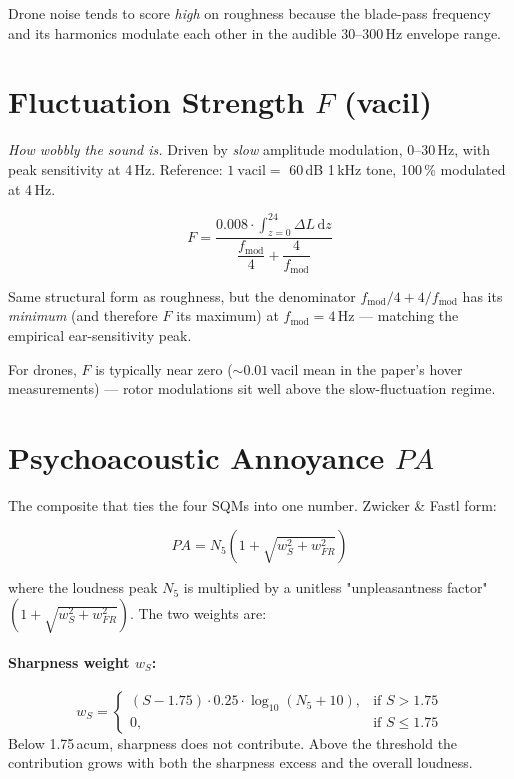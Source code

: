\documentclass[11pt,a4paper]{article}
\begin{document}
\noindent
Drone noise tends to score \emph{high} on roughness because the blade-pass frequency
and its harmonics modulate each other in the audible 30--300\,Hz envelope range.

\section{Fluctuation Strength \texorpdfstring{$F$}{F} (vacil)}

\textit{How wobbly the sound is.} Driven by \emph{slow} amplitude modulation, $0$--$30$\,Hz,
with peak sensitivity at 4\,Hz. Reference: $1\ \text{vacil} = $ 60\,dB 1\,kHz tone, 100\,\%
modulated at 4\,Hz.

\[
  F = \frac{0.008 \cdot \displaystyle\int_{z=0}^{24} \Delta L\, \mathrm{d}z}{\dfrac{f_{\text{mod}}}{4} + \dfrac{4}{f_{\text{mod}}}}
\]

\noindent
Same structural form as roughness, but the denominator $f_{\text{mod}}/4 + 4/f_{\text{mod}}$
has its \emph{minimum} (and therefore $F$ its maximum) at $f_{\text{mod}} = 4$\,Hz ---
matching the empirical ear-sensitivity peak.

For drones, $F$ is typically near zero ($\sim 0.01$\,vacil mean in the paper's hover
measurements) --- rotor modulations sit well above the slow-fluctuation regime.

\section{Psychoacoustic Annoyance \texorpdfstring{$PA$}{PA}}

The composite that ties the four SQMs into one number. Zwicker \& Fastl form:

\begin{paformula}
\[
  PA = N_5 \left(1 + \sqrt{w_S^2 + w_{FR}^2}\right)
\]
\end{paformula}

\noindent
where the loudness peak $N_5$ is multiplied by a unitless "unpleasantness factor"
$(1 + \sqrt{w_S^2 + w_{FR}^2})$. The two weights are:

\paragraph{Sharpness weight \boldmath$w_S$:}
\[
  w_S =
  \begin{cases}
    (S - 1.75) \cdot 0.25 \cdot \log_{10}(N_5 + 10), & \text{if } S > 1.75 \\
    0, & \text{if } S \le 1.75
  \end{cases}
\]
Below 1.75\,acum, sharpness does not contribute. Above the threshold the contribution
grows with both the sharpness excess and the overall loudness.
\end{document}
